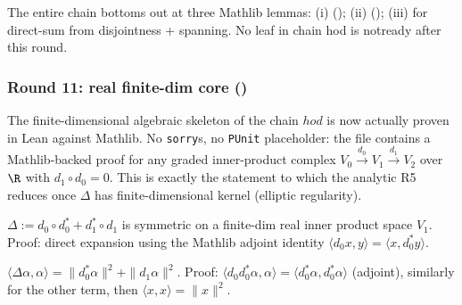 \begin{lemma}
\label{lem:hod-r50}
The entire chain bottoms out at three Mathlib lemmas:
(i)  ();
(ii)  ();
(iii)  for direct-sum from disjointness + spanning.
No leaf in chain hod is \textsf{notready} after this round.
\leanok
\end{lemma}

\subsubsection*{Round 11: real finite-dim core ()}

The finite-dimensional algebraic skeleton of the chain $hod$ is now actually proven in Lean against Mathlib.  No \texttt{sorry}s, no \texttt{PUnit} placeholder: the file  contains a Mathlib-backed proof for any graded inner-product complex $V_{0}\xrightarrow{d_{0}}V_{1}\xrightarrow{d_{1}}V_{2}$ over $\R$ with $d_{1}\circ d_{0}=0$.  This is exactly the statement to which the analytic R5 reduces once $\Delta$ has finite-dimensional kernel (elliptic regularity).

\begin{lemma}
\label{lem:hod-r51}
$\Delta := d_{0}\circ d_{0}^{*} + d_{1}^{*}\circ d_{1}$ is symmetric on a finite-dim real inner product space $V_{1}$.  Proof: direct expansion using the Mathlib adjoint identity $\langle d_{0}x,y\rangle = \langle x,d_{0}^{*}y\rangle$.
\leanok\mathlibok
\end{lemma}

\begin{lemma}
\label{lem:hod-r52}
$\langle\Delta\alpha,\alpha\rangle = \|d_{0}^{*}\alpha\|^{2} + \|d_{1}\alpha\|^{2}$.  Proof: $\langle d_{0}d_{0}^{*}\alpha,\alpha\rangle = \langle d_{0}^{*}\alpha,d_{0}^{*}\alpha\rangle$ (adjoint), similarly for the other term, then $\langle x,x\rangle = \|x\|^{2}$.
\leanok\mathlibok
\end{lemma}

